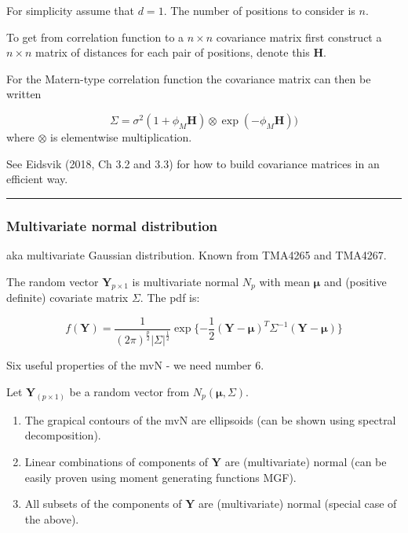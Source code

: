 \documentclass[
  letterpaper,
  DIV=11,
  numbers=noendperiod]{scrartcl}
\providecommand{\tightlist}{%
  \setlength{\itemsep}{0pt}\setlength{\parskip}{0pt}}\usepackage{longtable,booktabs,array}
\begin{document}
For simplicity assume that \(d=1\). The number of positions to consider
is \(n\).

To get from correlation function to a \(n \times n\) covariance matrix
first construct a \(n \times n\) matrix of distances for each pair of
positions, denote this \({\boldsymbol H}\).

For the Matern-type correlation function the covariance matrix can then
be written

\[ \Sigma=\sigma^2 (1+\phi_M {\boldsymbol H}) \otimes \exp(-\phi_M {\boldsymbol H}))\]
where \(\otimes\) is elementwise multiplication.

See Eidsvik (2018, Ch 3.2 and 3.3) for how to build covariance matrices
in an efficient way.

\begin{center}\rule{0.5\linewidth}{0.5pt}\end{center}

\hypertarget{multivariate-normal-distribution}{%
\subsubsection{Multivariate normal
distribution}\label{multivariate-normal-distribution}}

aka multivariate Gaussian distribution. Known from TMA4265 and TMA4267.

The random vector \(\boldsymbol{Y}_{p\times 1}\) is multivariate normal
\(N_p\) with mean \(\boldsymbol{\mu}\) and (positive definite) covariate
matrix \(\Sigma\). The pdf is:

\[f(\boldsymbol{Y})=\frac{1}{(2\pi)^\frac{p}{2}|\Sigma|^\frac{1}{2}} \exp\{-\frac{1}{2}(\boldsymbol{Y}-\boldsymbol{\mu})^T\Sigma^{-1}(\boldsymbol{Y}-\boldsymbol{\mu})\}\]

Six useful properties of the mvN - we need number 6.

Let \(\boldsymbol{Y}_{(p\times 1)}\) be a random vector from
\(N_p(\boldsymbol{\mu},\Sigma)\).

\begin{enumerate}
\def\labelenumi{\arabic{enumi}.}
\tightlist
\item
  The grapical contours of the mvN are ellipsoids (can be shown using
  spectral decomposition).
\item
  Linear combinations of components of \(\boldsymbol{Y}\) are
  (multivariate) normal (can be easily proven using moment generating
  functions MGF).
\item
  All subsets of the components of \(\boldsymbol{Y}\) are (multivariate)
  normal (special case of the above).
\end{enumerate}
\end{document}
